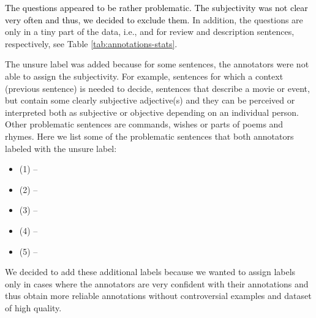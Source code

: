 \documentclass[10pt, a4paper]{article}
\begin{document}
\par \textcolor{black}{The questions appeared to be rather problematic. The subjectivity was not clear very often and thus, we decided to exclude them.} In addition, the questions are only in a tiny part of the data, i.e.,  and  for review and description sentences, respectively, see Table \ref{tab:annotations-stats}.







\par The unsure label was added because for some sentences, the annotators were not able to assign the subjectivity. For example,
sentences for which a context (previous sentence) is needed to decide, sentences that describe a movie or event, but contain some clearly subjective adjective(s) and they can be perceived or interpreted both as subjective or objective depending on an individual person. Other problematic sentences are commands, wishes or parts of poems and rhymes. Here we list some of the problematic sentences that both annotators labeled with the unsure label:

\begin{itemize}
	\small
	\item[] {(1)  -- }
	
\item[] {(2)  -- }
	
	\item[] {(3)  -- }
	
\item[] {(4)  -- }
	
	\item[] {(5)  -- }
\end{itemize}

\par We decided to add these additional labels because we wanted to assign labels only in cases where the annotators are very confident with their annotations and thus obtain more reliable annotations without controversial examples and dataset of high quality.   
\end{document}
